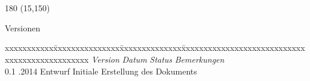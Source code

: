 \chapter*{}
\label{chap:versionen}

\begin{textblock}{180} (15,150)
\color{black}
\begin{huge}
Versionen
\end{huge}
\vspace{10mm}

\fontsize{10pt}{18pt}\selectfont
\begin{tabbing}
xxxxxxxxxxx\=xxxxxxxxxxxxxxx\=xxxxxxxxxxxxxx\=xxxxxxxxxxxxxxxxxxxxxxxxxxxxxxxxxxxxxxxxxxxxxxx \kill
\textit{Version}	\> \textit{Datum}	\> \textit{Status}		\> \textit{Bemerkungen}\\
0.1	.2014	\> Entwurf		\> Initiale Erstellung des Dokuments\\
\end{tabbing}

\end{textblock}
